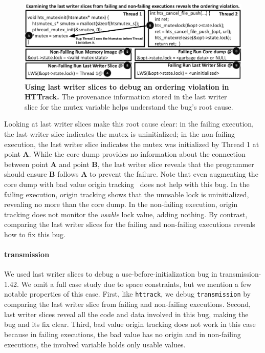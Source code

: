 \documentclass[preprint,9pt]{sigplanconf}
\begin{document}
\begin{figure}[h]
\centering
\includegraphics[width=\columnwidth]{figs/LWSHTTDebug.pdf}
\caption{\label{fig:httlws}{\bf Using last writer slices to debug an
ordering violation in HTTrack.} The provenance information stored in the last
writer slice for the mutex variable helps understand the bug's root cause.}
\end{figure}

Looking at last writer slices make this root cause clear: in the failing
execution, the last writer slice indicates the mutex is uninitialized; in the
non-failing execution, the last writer slice indicates the mutex was
initialized by Thread 1 at point {\bf A}. While the core dump provides no
information about the connection between point {\bf A} and point {\bf B}, the
last writer slice reveals that the programmer should ensure {\bf B} follows
{\bf A} to prevent the failure.  Note that even augmenting the core dump with
bad value origin tracking~\cite{badapples} does not help with this bug.  In the
failing execution, origin tracking shows that the unusable lock is
uninitialized, revealing no more than the core dump.  In the non-failing
execution, origin tracking does not monitor the {\em usable} lock value, adding
nothing.  By contrast, comparing the last writer slices for the failing and
non-failing executions reveals how to fix this bug.  


\paragraph{transmission} We used last writer slices to debug a
use-before-initialization bug in transmission-1.42.  We omit a full case study
due to space constraints, but we mention a few notable properties of this case.
First, like {\tt httrack}, we debug {\tt transmission} by comparing the last
writer slice from failing and non-failing executions.  Second, last writer
slices reveal all the code and data involved in this bug, making the bug and
its fix clear.   Third, bad value origin tracking does not work in this case
because in failing executions, the bad value has no origin and in non-failing
executions, the involved variable holds only usable values.
\end{document}
